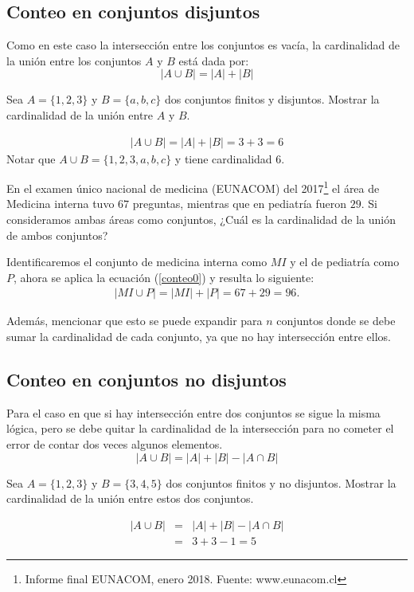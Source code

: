 \subsection{Conteo en conjuntos disjuntos}
Como en este caso la intersección entre los conjuntos es vacía, la cardinalidad de la unión entre los conjuntos $A$ y $B$ está dada por:
\begin{equation}
|A\cup B|=|A|+|B| \label{conteo0}
\end{equation}
\begin{myexample}
Sea $A=\{1,2,3\}$ y $B=\{a,b,c\}$ dos conjuntos finitos y disjuntos. Mostrar la cardinalidad de la unión entre $A$ y $B$.
\end{myexample}
\begin{eqnarray*}
|A\cup B|=|A|+|B|=3+3=6
\end{eqnarray*}
Notar que $A\cup B=\{1,2,3,a,b,c\}$ y tiene cardinalidad 6. 
\begin{myexample}
En el examen único nacional de medicina (EUNACOM) del 2017\footnote{Informe final EUNACOM, enero 2018. Fuente: www.eunacom.cl} el área de Medicina interna tuvo $67$ preguntas, mientras que en pediatría fueron $29$. Si consideramos ambas áreas como conjuntos, ¿Cuál es la cardinalidad de la unión de ambos conjuntos? 
\end{myexample}
Identificaremos el conjunto de medicina interna como $MI$ y el de pediatría como $P$, ahora se aplica la ecuación (\ref{conteo0}) y resulta lo siguiente:
\begin{eqnarray}
|MI\cup P|=|MI|+|P|=67+29=96.
\end{eqnarray}

Además, mencionar que esto se puede expandir para $n$ conjuntos donde se debe sumar la cardinalidad de cada conjunto, ya que no hay intersección entre ellos.

\subsection{Conteo en conjuntos no disjuntos}
Para el caso en que si hay intersección entre dos conjuntos se sigue la misma lógica, pero se debe quitar la cardinalidad de la intersección para no cometer el error de contar dos veces algunos elementos.
\begin{equation}
|A\cup B|=|A|+|B|-|A\cap B|
\end{equation}
\begin{myexample}
Sea $A=\{1,2,3\}$ y $B=\{3,4,5\}$ dos conjuntos finitos y no disjuntos. Mostrar la cardinalidad de la unión entre estos dos conjuntos.
\end{myexample}
\begin{eqnarray}
|A\cup B|&=&|A|+|B|-|A\cap B|\nonumber\\
&=& 3+3-1=5\nonumber
\end{eqnarray}

